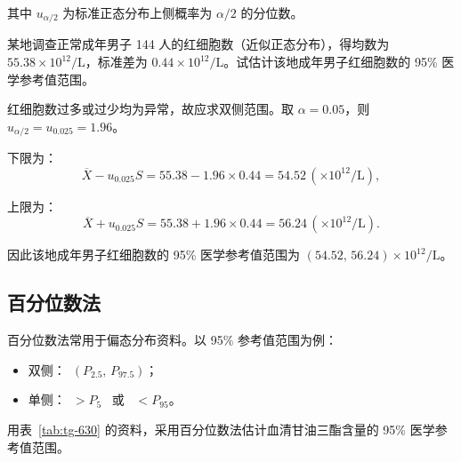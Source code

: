 \documentclass[lang=cn,10pt]{elegantbook}
\begin{document}
其中 $u_{\alpha/2}$ 为标准正态分布上侧概率为 $\alpha/2$ 的分位数。

\vspace{0.2cm}
\begin{exercise}
    某地调查正常成年男子 144 人的红细胞数（近似正态分布），得均数为 $55.38\times 10^{12}/\mathrm{L}$，标准差为 $0.44\times 10^{12}/\mathrm{L}$。试估计该地成年男子红细胞数的 95\% 医学参考值范围。
\end{exercise}

\vspace{0.2cm}
\begin{solution}
红细胞数过多或过少均为异常，故应求双侧范围。取 $\alpha=0.05$，则 $u_{\alpha/2}=u_{0.025}=1.96$。

下限为：
\[
\overline{X}-u_{0.025}S=55.38-1.96\times 0.44=54.52\,(\times 10^{12}/\mathrm{L}),
\]

上限为：
\[
\overline{X}+u_{0.025}S=55.38+1.96\times 0.44=56.24\,(\times 10^{12}/\mathrm{L}).
\]

因此该地成年男子红细胞数的 95\% 医学参考值范围为 $\left(54.52,\,56.24\right)\times 10^{12}/\mathrm{L}$。
\end{solution}

\subsection{百分位数法}

百分位数法常用于偏态分布资料。以 95\% 参考值范围为例：
\begin{itemize}
\item 双侧：\ $\left(P_{2.5},\,P_{97.5}\right)$；
\item 单侧：\ $>P_{5}$ \ 或 \ $<P_{95}$。
\end{itemize}

\vspace{0.2cm}
\begin{exercise}
    用表~\ref{tab:tg-630} 的资料，采用百分位数法估计血清甘油三酯含量的 95\% 医学参考值范围。
\end{exercise}
\end{document}
